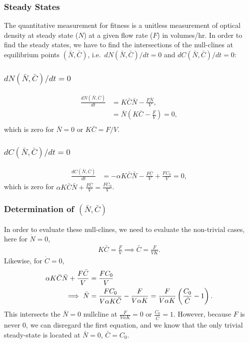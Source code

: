 \documentclass{beamer}
\begin{document}
\begin{frame}
  \frametitle{Steady States}
  The quantitative measurement for fitness is a unitless measurement of optical density at steady state ($N$) at a given flow rate ($F$) in volumes/hr.  In order to find the steady states, we have to find the intersections of the null-clines at equilibrium points $(\bar{N}, \bar{C})$, i.e.\ $dN(\bar{N},\bar{C})/dt = 0$ and $dC(\bar{N},\bar{C})/dt = 0$:
\end{frame}

\begin{frame}
  \frametitle{$dN(\bar{N},\bar{C})/dt = 0$}
  \begin{align*}
    \frac{dN(\bar{N}, \bar{C})}{dt} &= K\bar{C} \bar{N} - \frac{F\bar{N}}{V}, \\
    &= \bar{N} \left( K\bar{C} - \frac{F}{V} \right) = 0, \\
  \end{align*}
  which is zero for $\bar{N} = 0$ or $K \bar{C} = F/V$.
\end{frame}

\begin{frame}
  \frametitle{$dC(\bar{N},\bar{C})/dt = 0$}
  \begin{align*}
    \frac{dC(\bar{N}, \bar{C})}{dt} &= -\alpha K \bar{C} \bar{N} - \frac{F\bar{C}}{V} + \frac{FC_0}{V} = 0,
  \end{align*}
  which is zero for $\alpha K\bar{C} \bar{N} + \frac{F\bar{C}}{V} = \frac{FC_0}{V}$.
\end{frame}

\begin{frame}
  \frametitle{Determination of $(\bar{N}, \bar{C})$}
  In order to evaluate these null-clines, we need to evaluate the non-trivial cases, here for $\dot{N} = 0$,
  \begin{align}
    K \bar{C} = \frac{F}{V} \implies \bar{C} = \frac{F}{VK}.
  \end{align}
  Likewise, for $\dot{C} = 0$,
  \begin{align}
    \alpha K \bar{C} \bar{N} + \frac{F\bar{C}}{V} &= \frac{FC_0}{V} \notag \\
    \implies \bar{N} &= \frac{FC_0}{V \alpha K \bar{C}} - \frac{F}{V \alpha K} = \frac{F}{V \alpha K} \left(\frac{C_0}{\bar{C}} - 1 \right).
  \end{align}
  This intersects the $\bar{N} = 0$ nullcline at $\frac{F}{V\alpha K} = 0$ or $\frac{C_0}{\bar{C}} = 1$.  However, because $F$ is never 0, we can disregard the first equation, and we know that the only trivial steady-state is located at $\bar{N} = 0$, $\bar{C} = C_0$.
\end{frame}
\end{document}
